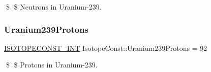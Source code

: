 \$ \$ Neutrons in Uranium-\/239. \mbox{\label{group___isotope_const-_uranium-_u239_gaff61ad23e900a291fe92f4224073fefc}} 
\subsubsection{\texorpdfstring{Uranium239\+Protons}{Uranium239Protons}}
{\footnotesize\ttfamily \mbox{\hyperlink{group___isotope_const-_macros_ga5f18360b3e99483a35c32d789e62621c}{I\+S\+O\+T\+O\+P\+E\+C\+O\+N\+S\+T\+\_\+\+I\+NT}} Isotope\+Const\+::\+Uranium239\+Protons = 92}

\$ \$ Protons in Uranium-\/239. 